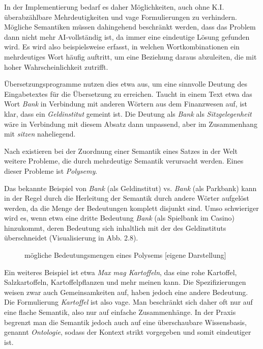 \documentclass[12pt]{report}
\begin{document}
In der Implementierung bedarf es daher Möglichkeiten, auch ohne K.I. überabzählbare Mehrdeutigkeiten und vage Formulierungen zu verhindern. Mögliche Semantiken müssen dahingehend beschränkt werden, dass das Problem dann nicht mehr AI-vollständig ist, da immer eine eindeutige Lösung gefunden wird. Es wird also beispielsweise erfasst, in welchen Wortkombinationen ein mehrdeutiges Wort häufig auftritt, um eine Beziehung daraus abzuleiten, die mit hoher Wahrscheinlichkeit zutrifft. 

Übersetzungsprogramme nutzen dies etwa aus, um eine sinnvolle Deutung des Eingabetextes für die Übersetzung zu erreichen. Taucht in einem Text etwa das Wort \textit{Bank} in Verbindung mit anderen Wörtern aus dem Finanzwesen auf, ist klar, dass ein \textit{Geldinstitut} gemeint ist. Die Deutung als \textit{Bank} als \textit{Sitzgelegenheit} wäre in Verbindung mit diesem Absatz dann unpassend, aber im Zusammenhang mit \textit{sitzen} naheliegend. 

Nach \cite{car52} existieren bei der Zuordnung einer Semantik eines Satzes in der Welt weitere Probleme, die durch mehrdeutige Semantik verursacht werden. Eines dieser Probleme ist \textit{Polysemy}. 

Das bekannte Beispiel von \textit{Bank} (als Geldinstitut) vs. \textit{Bank} (als Parkbank) kann in der Regel durch die Herleitung der Semantik durch andere Wörter aufgelöst werden, da die Menge der Bedeutungen komplett disjunkt sind. Umso schwieriger wird es, wenn etwa eine dritte Bedeutung \textit{Bank} (als Spielbank im Casino) hinzukommt, deren Bedeutung sich inhaltlich mit der des Geldinstituts überschneidet (Visualisierung in Abb. 2.8). 

\begin{figure}[h!]
\caption{mögliche Bedeutungsmengen eines Polysems [eigene Darstellung]}
\end{figure}

Ein weiteres Beispiel ist etwa \textit{\glqq  Max mag Kartoffeln\grqq{}}, das eine rohe Kartoffel, Salzkartoffeln, Kartoffelpflanzen und mehr meinen kann. Die Spezifizierungen weisen zwar auch Gemeinsamkeiten auf, haben jedoch eine andere Bedeutung. Die Formulierung \textit{Kartoffel} ist also vage.
Man beschränkt sich daher oft nur auf eine flache Semantik, also nur auf einfache Zusammenhänge. In der Praxis begrenzt man die Semantik jedoch auch auf eine überschaubare Wissensbasis, genannt \textit{\glqq  Ontologie\grqq{}}, sodass der Kontext strikt vorgegeben und somit eindeutiger ist.
\end{document}
